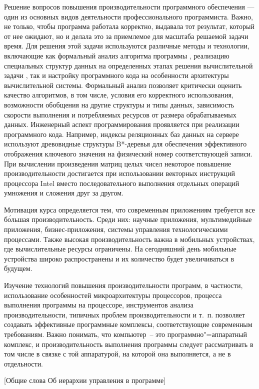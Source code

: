 \documentclass[14pt, a4paper, openany, twoside, draft]{extbook} %
\newcommand{\e}[2][fcolor]{\textcolor{pcolor}{[}\textcolor{#1}{#2}\textcolor{pcolor}{]}}
\begin{document}
Решение вопросов повышения производительности программного обеспечения --- один из основных видов деятельности профессионального программиста.  Важно, не только, чтобы программа работала корректно, выдавала тот результат, который от нее ожидают, но и делала это за приемлемое для масштаба решаемой задачи время.  Для решения этой задачи используются различные методы и технологии, включающие как формальный анализ алгоритма программы \cite{progproof}, реализацию специальных структур данных на определенных этапах решения вычислительной задачи \cite{algstruct}, так и настройку программного кода на особенности архитектуры вычислительной системы.  Формальный анализ позволяет критически оценить качество алгоритмов, в том числе, условия его корректного использования, возможности обобщения на другие структуры и типы данных, зависимость скорости выполнения и потребляемых ресурсов от размера обрабатываемых данных.  Инженерный аспект программирования проявляется при реализации программного кода.  Например, индексы реляционных баз данных на сервере используют древовидные структуры B*-деревья для обеспечения эффективного отображения ключевого значения на физический номер соответствующей записи.  При вычислении произведения матриц целых чисел некоторое повышение производительности достигается при использовании векторных инструкций процессора Intel вместо последовательного выполнения отдельных операций умножения и сложения друг за другом.

Мотивация курса определяется тем, что современным приложениям требуется все б\'ольшая производительность. Среди них: научные приложения, мультимедийные приложения, бизнес-приложения, системы управления технологическими процессами. Также высокая производительность важна в мобильных устройствах, где вычислительные ресурсы ограничены. На сегодняшний день мобильные устройства широко распространены и их количество будет увеличиваться в будущем.

Изучение технологий повышения производительности программ, в частности, использование особенностей микроархитектуры процессоров, процесса выполнения программы на процессоре, инструментов анализа производительности, типичных проблем производительности и т.~п. позволяет создавать эффективные программные комплексы, соответствующие современным требованиям.  Важно понимать, что компьютер~-- это программно"=аппаратный комплекс, и производительность выполнения программы следует рассматривать в том числе в связке с той аппаратурой, на которой она выполняется, а не в отдельности.

\e{Общие слова Об иерархии управления в программе}
\end{document}
